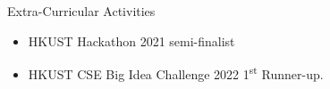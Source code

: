 \documentclass{resume} %
\begin{document}
\begin{rSection}{Extra-Curricular Activities}
    \begin{itemize}
        \item 	HKUST Hackathon 2021 semi-finalist
        \item	HKUST CSE Big Idea Challenge 2022 1\textsuperscript{st} Runner-up.
    \end{itemize}
\end{rSection}




\end{document}
